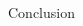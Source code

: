 \documentclass[final]{beamer}
\begin{document}
\begin{frame}{}
\begin{textblock}{0.22}
\begin{block}{Conclusion \phantom{p}}
\vspace{-1cm}

\end{block}

\end{textblock}


\end{frame}
\end{document}

